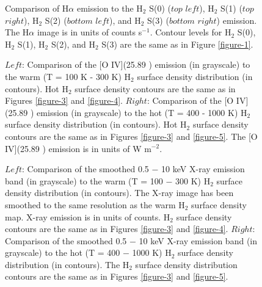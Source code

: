 \documentclass[manuscript]{aastex}
\begin{document}
\clearpage

\begin{figure}
\caption{Comparison of H$\alpha$ emission to the $\mathrm{H_2}$ S(0) ($top$ $left$),  
$\mathrm{H_2}$ S(1) ($top$ $right$),  $\mathrm{H_2}$ S(2) ($bottom$ $left$),  and 
$\mathrm{H_2}$ S(3) ($bottom$ $right$) emission.  The H$\alpha$ image is in units 
of counts s$^{-1}$.  Contour levels for $\mathrm{H_2}$ S(0), $\mathrm{H_2}$ S(1), 
$\mathrm{H_2}$ S(2), and $\mathrm{H_2}$ S(3) are the same as in Figure \ref{figure-1}.}
\label{figure-10}
\end{figure}

\clearpage

\begin{figure}
\caption{$Left$:  Comparison of the [O IV](25.89 \micron) emission (in grayscale) to 
the warm (T = 100 K - 300 K) $\mathrm{H_2}$ surface density distribution (in contours).  
Hot $\mathrm{H_2}$ surface density contours are the same as in Figures \ref{figure-3} and \ref{figure-4}.  
$Right$: Comparison of the [O IV](25.89 \micron) emission (in grayscale) to the hot 
(T = 400 - 1000 K) $\mathrm{H_2}$ surface density distribution (in contours).  Hot $\mathrm{H_2}$ 
surface density contours are the same as in Figures \ref{figure-3} and \ref{figure-5}.  The [O IV](25.89 \micron)
 emission is in units of W $\mathrm{m^{-2}}$.}
\label{figure-11}
\end{figure}

\clearpage

\begin{figure}
\caption{$Left$:  Comparison of the smoothed 0.5 $-$ 10 keV X-ray emission band 
(in grayscale) to the warm (T = 100 $-$ 300 K) $\mathrm{H_2}$ surface density distribution 
(in contours).   The X-ray image has been smoothed to the same resolution as the 
warm $\mathrm{H_2}$ surface density map.  X-ray emission is in units of counts.  $\mathrm{H_2}$ 
surface density contours are the same as in Figures \ref{figure-3} and \ref{figure-4}.  $Right$: Comparison of the smoothed 0.5 $-$ 10 keV X-ray emission band (in grayscale) to the hot 
(T = 400 $-$ 1000 K) $\mathrm{H_2}$ surface density distribution (in contours).  The 
$\mathrm{H_2}$ surface density distribution contours are the same as in Figures \ref{figure-3} 
and \ref{figure-5}.}
\label{figure-12}
\end{figure}
\end{document}
